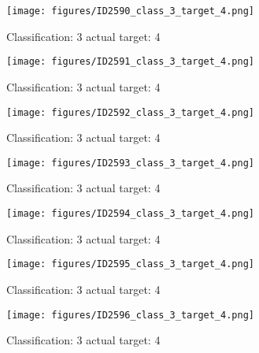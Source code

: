 \begin{figure}[h!]
\begin{center}
\texttt{[image: figures/ID2590\_class\_3\_target\_4.png]}
\end{center}
\caption{ Classification: 3 actual target: 4}
\label{fig:ID2590_class_3_target_4}
\end{figure}
\begin{figure}[h!]
\begin{center}
\texttt{[image: figures/ID2591\_class\_3\_target\_4.png]}
\end{center}
\caption{ Classification: 3 actual target: 4}
\label{fig:ID2591_class_3_target_4}
\end{figure}
\begin{figure}[h!]
\begin{center}
\texttt{[image: figures/ID2592\_class\_3\_target\_4.png]}
\end{center}
\caption{ Classification: 3 actual target: 4}
\label{fig:ID2592_class_3_target_4}
\end{figure}
\begin{figure}[h!]
\begin{center}
\texttt{[image: figures/ID2593\_class\_3\_target\_4.png]}
\end{center}
\caption{ Classification: 3 actual target: 4}
\label{fig:ID2593_class_3_target_4}
\end{figure}
\begin{figure}[h!]
\begin{center}
\texttt{[image: figures/ID2594\_class\_3\_target\_4.png]}
\end{center}
\caption{ Classification: 3 actual target: 4}
\label{fig:ID2594_class_3_target_4}
\end{figure}
\begin{figure}[h!]
\begin{center}
\texttt{[image: figures/ID2595\_class\_3\_target\_4.png]}
\end{center}
\caption{ Classification: 3 actual target: 4}
\label{fig:ID2595_class_3_target_4}
\end{figure}
\begin{figure}[h!]
\begin{center}
\texttt{[image: figures/ID2596\_class\_3\_target\_4.png]}
\end{center}
\caption{ Classification: 3 actual target: 4}
\label{fig:ID2596_class_3_target_4}
\end{figure}
